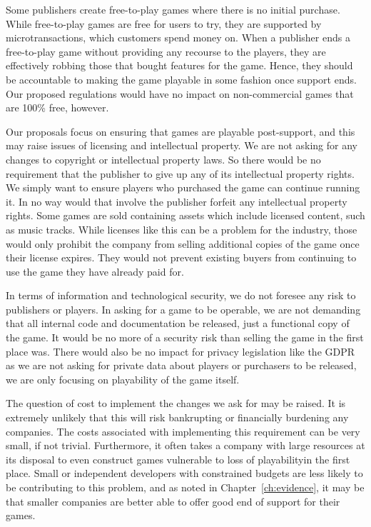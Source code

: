 Some publishers create free-to-play games where there is no initial purchase.
While free-to-play games are free for users to try, they are supported by microtransactions, which customers spend money on\cn.
When a publisher ends a free-to-play game without providing any recourse to the players, they are effectively robbing those that bought features for the game.
Hence, they should be accountable to making the game playable in some fashion once support ends.
Our proposed regulations would have no impact on non-commercial games that are 100\% free, however.

Our proposals focus on ensuring that games are playable post-support, and this may raise issues of licensing and intellectual property.
We are not asking for any changes to copyright or intellectual property laws.
So there would be no requirement that the publisher to give up any of its intellectual property rights.
We simply want to ensure players who purchased the game can continue running it.
In no way would that involve the publisher forfeit any intellectual property rights.
Some games are sold containing assets which include licensed content, such as music tracks.
While licenses like this can be a problem for the industry, those would only prohibit the company from selling additional copies of the game once their license expires.
They would not prevent existing buyers from continuing to use the game they have already paid for.

In terms of information and technological security, we do not foresee any risk to publishers or players.
In asking for a game to be operable, we are not demanding that all internal code and documentation be released, just a functional copy of the game.
It would be no more of a security risk than selling the game in the first place was.
There would also be no impact for privacy legislation like the GDPR as we are not asking for private data about players or purchasers to be released,
we are only focusing on playability of the game itself.

The question of cost to implement the changes we ask for may be raised.
It is extremely unlikely that this will risk bankrupting or financially burdening any companies.
The costs associated with implementing this requirement can be very small, if not trivial\cn.
Furthermore, it often takes a company with large resources at its disposal to even construct games vulnerable to loss of playability\cn in the first place.
Small or independent developers with constrained budgets are less likely to be contributing to this problem,
and as noted in Chapter~\ref{ch:evidence}, it may be that smaller companies are better able to offer good end of support for their games.
